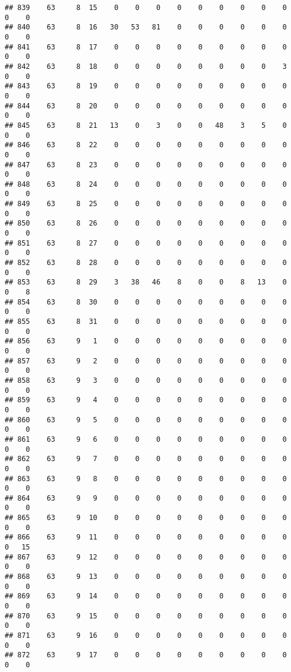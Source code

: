 \documentclass[]{article}
\begin{document}
\begin{verbatim}
## 839    63     8  15    0    0    0    0    0    0    0    0    0    0    0
## 840    63     8  16   30   53   81    0    0    0    0    0    0    0    0
## 841    63     8  17    0    0    0    0    0    0    0    0    0    0    0
## 842    63     8  18    0    0    0    0    0    0    0    0    3    0    0
## 843    63     8  19    0    0    0    0    0    0    0    0    0    0    0
## 844    63     8  20    0    0    0    0    0    0    0    0    0    0    0
## 845    63     8  21   13    0    3    0    0   48    3    5    0    0    0
## 846    63     8  22    0    0    0    0    0    0    0    0    0    0    0
## 847    63     8  23    0    0    0    0    0    0    0    0    0    0    0
## 848    63     8  24    0    0    0    0    0    0    0    0    0    0    0
## 849    63     8  25    0    0    0    0    0    0    0    0    0    0    0
## 850    63     8  26    0    0    0    0    0    0    0    0    0    0    0
## 851    63     8  27    0    0    0    0    0    0    0    0    0    0    0
## 852    63     8  28    0    0    0    0    0    0    0    0    0    0    0
## 853    63     8  29    3   38   46    8    0    0    8   13    0    0    8
## 854    63     8  30    0    0    0    0    0    0    0    0    0    0    0
## 855    63     8  31    0    0    0    0    0    0    0    0    0    0    0
## 856    63     9   1    0    0    0    0    0    0    0    0    0    0    0
## 857    63     9   2    0    0    0    0    0    0    0    0    0    0    0
## 858    63     9   3    0    0    0    0    0    0    0    0    0    0    0
## 859    63     9   4    0    0    0    0    0    0    0    0    0    0    0
## 860    63     9   5    0    0    0    0    0    0    0    0    0    0    0
## 861    63     9   6    0    0    0    0    0    0    0    0    0    0    0
## 862    63     9   7    0    0    0    0    0    0    0    0    0    0    0
## 863    63     9   8    0    0    0    0    0    0    0    0    0    0    0
## 864    63     9   9    0    0    0    0    0    0    0    0    0    0    0
## 865    63     9  10    0    0    0    0    0    0    0    0    0    0    0
## 866    63     9  11    0    0    0    0    0    0    0    0    0    0   15
## 867    63     9  12    0    0    0    0    0    0    0    0    0    0    0
## 868    63     9  13    0    0    0    0    0    0    0    0    0    0    0
## 869    63     9  14    0    0    0    0    0    0    0    0    0    0    0
## 870    63     9  15    0    0    0    0    0    0    0    0    0    0    0
## 871    63     9  16    0    0    0    0    0    0    0    0    0    0    0
## 872    63     9  17    0    0    0    0    0    0    0    0    0    0    0

\end{verbatim}
\end{document}
